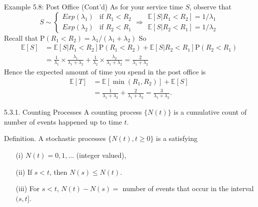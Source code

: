 \documentclass[letterpaper,handout, mathserif]{beamer}
\def\p{\mathrm P}
\def\E{\mathbb E}
\begin{document}
\begin{frame}{Example 5.8: Post Office (Cont'd)}
As for your service time $S$, observe that
$$
S\sim
\begin{cases}
Exp(\lambda_1) &\text{if }R_1 < R_2\\
Exp(\lambda_2) &\text{if }R_2 < R_1
\end{cases}
\Rightarrow
\begin{array}{l}
\E[S|R_1 < R_2] = 1/\lambda_1\\
\E[S|R_2 < R_1] = 1/\lambda_2
\end{array}
$$
Recall that $\p(R_1 < R_2)=\lambda_1/(\lambda_1+\lambda_2)$
So
\begin{align*}
\E[S]&= \E[S|R_1 < R_2]\p(R_1 < R_2)+\E[S|R_2 < R_1]\p(R_2 < R_1)\\
&=\frac{1}{\lambda_1}\times\frac{\lambda_1}{\lambda_1+\lambda_2}+
\frac{1}{\lambda_2}\times\frac{\lambda_2}{\lambda_1+\lambda_2}=\frac{2}{\lambda_1+\lambda_2}
\end{align*}
Hence the expected amount of time you spend in the post office is
\begin{align*}
\E[T] &= \E[\min(R_1, R_2)] + \E[S]\\
&= \frac{1}{\lambda_1+\lambda_2} + \frac{2}{\lambda_1+\lambda_2} =\frac{3}{\lambda_1+\lambda_2}.
\end{align*}
\end{frame}
\begin{frame}{5.3.1. Counting Processes}
A counting process $\{N(t)\}$ is a cumulative count of number of events happened up to time $t$.

\begin{block}{Definition.}
A stochastic processes $\{N(t),t\ge 0\}$ is a  satisfying
\begin{itemize}
\item [(i)] $N(t)=0,1,\ldots$ (integer valued),
\item [(ii)] If $s <t$, then $N(s)\le N(t)$.
\item [(iii)] For $s < t$, $N(t) - N(s)=$ number of events that occur in the interval $(s, t]$.
\end{itemize}
\end{block}
\end{frame}
\end{document}
